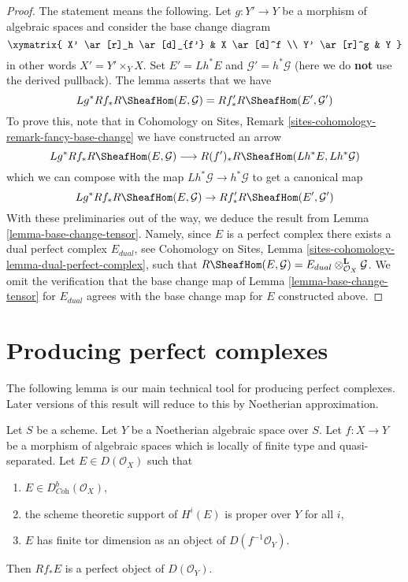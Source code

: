 \begin{proof}
The statement means the following. Let $g : Y' \to Y$ be a morphism of
algebraic spaces and consider the base change diagram
$$
\xymatrix{
X' \ar[r]_h \ar[d]_{f'} &
X \ar[d]^f \\
Y' \ar[r]^g &
Y
}
$$
in other words $X' = Y' \times_Y X$. Set $E' = Lh^*E$ and
$\mathcal{G}' = h^*\mathcal{G}$ (here we do {\bf not} use the derived
pullback). The lemma asserts that we have
$$
Lg^*Rf_*R\SheafHom(E, \mathcal{G}) = Rf'_*R\SheafHom(E', \mathcal{G}')
$$
To prove this, note that in
Cohomology on Sites, Remark \ref{sites-cohomology-remark-fancy-base-change}
we have constructed an arrow
$$
Lg^*Rf_*R\SheafHom(E, \mathcal{G})
\longrightarrow
R(f')_*R\SheafHom(Lh^*E, Lh^*\mathcal{G})
$$
which we can compose with the map $Lh^*\mathcal{G} \to h^*\mathcal{G}$
to get a canonical map
$$
Lg^*Rf_*R\SheafHom(E, \mathcal{G}) \to Rf'_*R\SheafHom(E', \mathcal{G}')
$$
With these preliminaries out of the way, we deduce the result from
Lemma \ref{lemma-base-change-tensor}. Namely, since $E$ is a perfect
complex there exists a dual perfect complex $E_{dual}$, see
Cohomology on Sites, Lemma \ref{sites-cohomology-lemma-dual-perfect-complex},
such that $R\SheafHom(E, \mathcal{G}) =
E_{dual} \otimes_{\mathcal{O}_X}^\mathbf{L} \mathcal{G}$.
We omit the verification that the base change map of
Lemma \ref{lemma-base-change-tensor} for $E_{dual}$ agrees with the
base change map for $E$ constructed above.
\end{proof}















\section{Producing perfect complexes}
\label{section-producing-perfect}

\noindent
The following lemma is our main technical tool for producing
perfect complexes. Later versions of this result will reduce to
this by Noetherian approximation.

\begin{lemma}
\label{lemma-perfect-direct-image}
Let $S$ be a scheme. Let $Y$ be a Noetherian algebraic space over $S$.
Let $f : X \to Y$ be a morphism of algebraic spaces which is locally of
finite type and quasi-separated. Let $E \in D(\mathcal{O}_X)$ such that
\begin{enumerate}
\item $E \in D^b_{\textit{Coh}}(\mathcal{O}_X)$,
\item the scheme theoretic support of $H^i(E)$ is proper over $Y$ for all $i$,
\item $E$ has finite tor dimension as an object of $D(f^{-1}\mathcal{O}_Y)$.
\end{enumerate}
Then $Rf_*E$ is a perfect object of $D(\mathcal{O}_Y)$.
\end{lemma}

